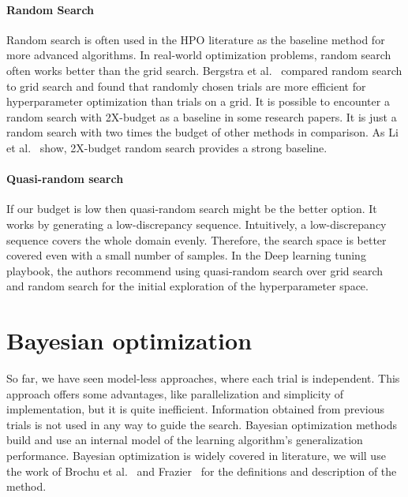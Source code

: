 \paragraph{Random Search} Random search is often used in the HPO literature as the baseline method for more advanced algorithms. In real-world optimization problems, random search often works better than the grid search. Bergstra et al.~\cite{bergstra2012random} compared random search to grid search and found that randomly chosen trials are more efficient for hyperparameter optimization than trials on a grid. It is possible to encounter a random search with 2X-budget as a baseline in some research papers. It is just a random search with two times the budget of other methods in comparison. As Li et al.~\cite{li2018hyperband} show, 2X-budget random search provides a strong baseline.

\paragraph{Quasi-random search} If our budget is low then quasi-random search might be the better option. It works by generating a low-discrepancy sequence. Intuitively, a low-discrepancy sequence covers the whole domain evenly. Therefore, the search space is better covered even with a small number of samples. In the Deep learning tuning playbook, the authors recommend using quasi-random search over grid search and random search for the initial exploration of the hyperparameter space.



\section{Bayesian optimization}
So far, we have seen model-less approaches, where each trial is independent. This approach offers some advantages, like parallelization and simplicity of implementation, but it is quite inefficient. Information obtained from previous trials is not used in any way to guide the search. Bayesian optimization methods build and use an internal model of the learning algorithm's generalization performance. Bayesian optimization is widely covered in literature, we will use the work of Brochu et al.~\cite{brochu2010tutorial} and Frazier~\cite{frazier2018tutorial} for the definitions and description of the method.

